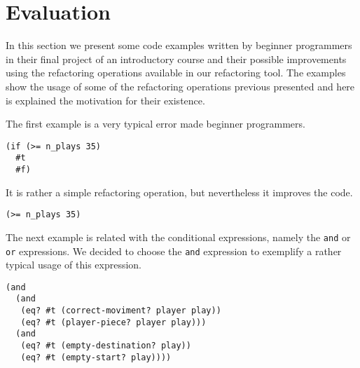 

\section{Evaluation}
In this section we present some code examples written by beginner programmers
in their final project of an introductory course and their possible improvements
using the refactoring operations available in our refactoring tool.
The examples show the usage of some of the refactoring operations previous presented
and here is explained the motivation for their existence.

\lstset{style=racket}


The first example is a very typical error made beginner programmers.
\begin{lstlisting}
(if (>= n_plays 35)
  #t
  #f)
\end{lstlisting}
It is rather a simple refactoring operation, but nevertheless it improves the code.
\begin{lstlisting}
(>= n_plays 35)
\end{lstlisting}

The next example is related with the conditional expressions, namely the {\tt and}
or {\tt or} expressions. We decided to choose the {\tt and} expression to exemplify a
rather typical usage of this expression.
\begin{lstlisting}
(and
  (and
   (eq? #t (correct-moviment? player play))
   (eq? #t (player-piece? player play)))
  (and
   (eq? #t (empty-destination? play))
   (eq? #t (empty-start? play))))
\end{lstlisting}


